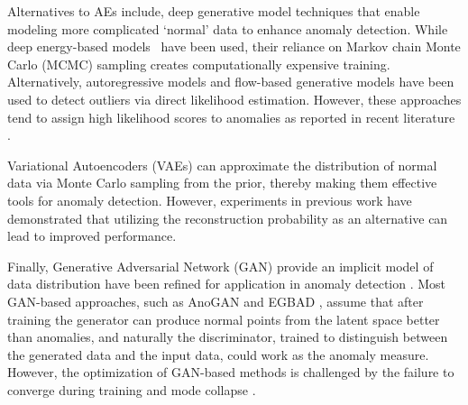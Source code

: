 Alternatives to AEs include, deep generative model techniques that enable modeling more complicated `normal' data to enhance anomaly detection. While deep energy-based models~\cite{zhai2016deep} have been used, their reliance on Markov chain Monte Carlo (MCMC) sampling creates computationally expensive training. Alternatively, autoregressive models \cite{salimans2017pixelcnn++} and flow-based generative models \cite{kingma2018glow} have been used to detect outliers 
via direct likelihood estimation. However, these approaches tend to assign high likelihood scores to anomalies as reported in recent literature \cite{choi2018waic,ren2019likelihood,yoon2024energy}.

Variational Autoencoders (VAEs) can approximate the distribution of normal data via Monte Carlo sampling from the prior, thereby making them effective tools for anomaly detection.  However, experiments in previous work \cite{nalisnick2018deep,xu2018unsupervised} have demonstrated that utilizing the reconstruction probability \cite{an2015variational} as an alternative can lead to improved performance.

Finally, Generative Adversarial Network (GAN) \cite{goodfellow2014generative} provide an implicit model of data distribution have been refined for application in anomaly detection \cite{di2019survey}. Most GAN-based approaches, such as AnoGAN \cite{schlegl2017unsupervised} and EGBAD \cite{zenati2018efficient}, assume that after training the generator can produce normal points from the latent space better than anomalies, and naturally the discriminator, trained to distinguish  between the generated data and the input data, could work as the anomaly measure.  However, the optimization of GAN-based methods is challenged by the failure to converge during training and mode collapse \cite{metz2016unrolled}.